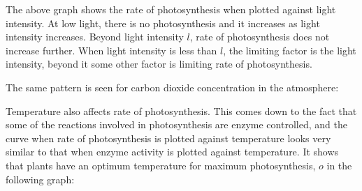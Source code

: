 \begin{center}
\end{center}
The above graph shows the rate of photosynthesis when plotted against light intensity. At low light,
there is no photosynthesis and it increases as light intensity increases. Beyond light intensity
$l$, rate of photosynthesis does not increase further. When light intensity is less than $l$, the
limiting factor is the light intensity, beyond it some other factor is limiting rate of photosynthesis.

The same pattern is seen for carbon dioxide concentration in the atmosphere:
\begin{center}
\end{center}

Temperature also affects rate of photosynthesis. This comes down to the fact that some of the
reactions involved in photosynthesis are enzyme controlled, and the curve when rate of photosynthesis
is plotted against temperature looks very similar to that when enzyme activity is plotted against
temperature. It shows that plants have an optimum temperature for maximum photosynthesis, $o$ in
the following graph:


